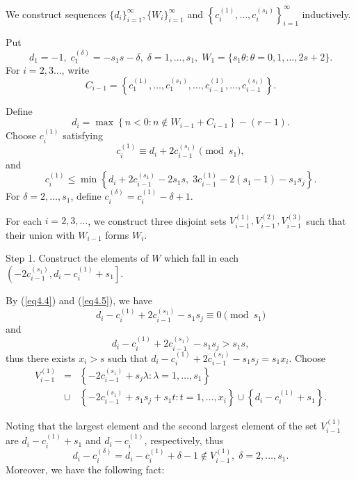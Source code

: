 \documentclass[12pt]{article}
\numberwithin{equation}{section}
\begin{document}
We construct sequences $\{d_{i}\}^{\infty}_{i=1}, \{W_{i}\}^{\infty}_{i=1}$ and $\left\{c_{i}^{(1)}, \ldots,c_{i}^{(s_1)}\right\}^{\infty}_{i=1}$ inductively.

Put $$d_{1}=-1,\; c_{1}^{(\delta)}=-s_1s-\delta,\; \delta=1,\ldots,s_1,\;W_{1}=\{s_1\theta: \theta=0,1,\ldots,2s+2\}.$$
For $i=2,3\ldots$, write $$C_{i-1}=\left\{c_{1}^{(1)} ,\ldots,c_{1}^{(s_1)}, \ldots, c_{i-1}^{(1)}, \ldots,c_{i-1}^{(s_1)}\right\}.$$

Define \begin{equation}\label{eq4.3}d_{i}=\max\left\{n<0: n\notin W_{i-1}+C_{i-1}\right\}-(r-1).\end{equation}
Choose $c_{i}^{(1)}$ satisfying \begin{equation}\label{eq4.4}c_{i}^{(1)}\equiv d_{i}+2c_{i-1}^{(s_1)} \pmod{s_1},\end{equation}
and
\begin{equation}\label{eq4.5}c_{i}^{(1)}\leqslant\min\left\{d_{i}+2c_{i-1}^{(s_1)}-2s_1 s, \;3c_{i-1}^{(1)}-2(s_1-1)-s_1s_j\right\}.\end{equation}
For $\delta=2,\dots,s_1$, define $c_{i}^{(\delta)}=c_{i}^{(1)}-\delta+1.$

For each $i=2,3,\ldots$, we construct three disjoint sets
$V_{i-1}^{(1)}, V_{i-1}^{(2)}, V_{i-1}^{(3)}$ such that their union
with $W_{i-1}$ forms $W_i$.

Step 1. Construct the elements of $W$ which fall in each $\left(-2c_{i-1}^{(s_1)}, d_i-c_{i}^{(1)}+s_1\right]$.

By (\ref{eq4.4}) and (\ref{eq4.5}), we have $$d_{i}-c_{i}^{(1)}+2c_{i-1}^{(s_1)}-s_1s_j\equiv 0 \pmod{s_1}$$ and
$$d_{i}-c_{i}^{(1)}+2c_{i-1}^{(s_1)}-s_1s_j>s_1s,$$
thus there exists $x_{i}> s$ such that
$d_{i}-c_{i}^{(1)}+2c_{i-1}^{(s_1)}-s_1s_j=s_1x_{i}.$
Choose
\begin{eqnarray}\label{eeq2.1}V_{i-1}^{(1)}&=&\left\{-2c_{i-1}^{(s_1)}+s_j\lambda:\lambda=1,\ldots,s_1\right\}\\ \nonumber
&\cup&\left\{ -2c_{i-1}^{(s_1)}+s_1s_j+s_1t:t=1,\ldots,x_{i}\right\}
\cup\left\{d_i-c_{i}^{(1)}+s_1\right\}. \nonumber
\end{eqnarray}

Noting that the largest element and the second largest element of the set $V_{i-1}^{(1)}$ are $d_i-c_{i}^{(1)}+s_1$ and $d_i-c_{i}^{(1)}$, respectively, thus\begin{equation}\label{iv-b}d_{i}-c_{i}^{(\delta)}=d_{i}-c_{i}^{(1)}+\delta-1\not\in V_{i-1}^{(1)}, \;\delta=2,\ldots,s_1. \tag{iv-a}\end{equation}
Moreover, we have the following fact:
\end{document}
